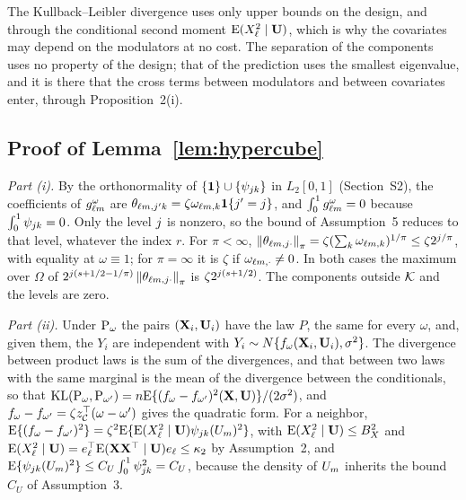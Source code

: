 The Kullback--Leibler divergence uses only upper bounds on the design, and
through the conditional second moment $\mathrm{E}(X_{\ell}^{2}\mid\mathbf{U})$, which is why
the covariates may depend on the modulators at no cost. The separation of the
components uses no property of the design; that of the prediction uses the
smallest eigenvalue, and it is there that the cross terms between modulators
and between covariates enter, through Proposition~2(i).

\subsection*{Proof of Lemma~\ref{lem:hypercube}}

\emph{Part (i).} By the orthonormality of $\{\mathbf{1}\}\cup\{\psi_{jk}\}$
in $L_2[0,1]$ (Section~S2), the coefficients of $g_{\ell m}^{\omega}$
are $\theta_{\ell m,j'k} = \zeta\omega_{\ell m,k}\mathbf{1}\{j' =
j\}$, and $\int_0^1g_{\ell m}^{\omega} = 0$ because
$\int_0^1\psi_{jk} = 0$. Only the level $j$ is nonzero, so the bound
of Assumption~5 reduces to that level, whatever the index $r$. For
$\pi < \infty$, $\left\lVert \theta_{\ell m,j\cdot} \right\rVert_{\pi} =
\zeta(\sum_{k}\omega_{\ell m,k})^{1/\pi} \le \zeta2^{j/\pi}$, with
equality at $\omega \equiv 1$; for $\pi = \infty$ it is $\zeta$ if
$\omega_{\ell m,\cdot} \ne 0$. In both cases the maximum over $\Omega$ of
$2^{j(s+1/2-1/\pi)}\left\lVert \theta_{\ell m,j\cdot} \right\rVert_{\pi}$ is
$\zeta2^{j(s+1/2)}$. The components outside $\mathcal{K}$ and the levels are
zero.

\emph{Part (ii).} Under $\mathrm{P}_{\omega}$ the pairs $(\mathbf{X}_i,\mathbf{U}_i)$ have the
law $P$, the same for every $\omega$, and, given them, the $Y_i$ are
independent with $Y_i \sim N\{f_{\omega}(\mathbf{X}_i,\mathbf{U}_i),\sigma^{2}\}$. The
divergence between product laws is the sum of the divergences, and that
between two laws with the same marginal is the mean of the divergence between
the conditionals, so that
$\operatorname{KL}(\mathrm{P}_{\omega},\mathrm{P}_{\omega'}) =
n\mathrm{E}\{(f_{\omega}-f_{\omega'})^{2}(\mathbf{X},\mathbf{U})\}/(2\sigma^{2})$, and
$f_{\omega}-f_{\omega'} = \zeta z_{\mathcal{C}}^{\top}(\omega-\omega')$ gives the
quadratic form. For a neighbor, $\mathrm{E}\{(f_{\omega}-f_{\omega'})^{2}\} =
\zeta^{2}\mathrm{E}\{\mathrm{E}(X_{\ell}^{2}\mid\mathbf{U})\psi_{jk}(U_{m})^{2}\}$, with
$\mathrm{E}(X_{\ell}^{2}\mid\mathbf{U}) \le B_X^{2}$ and $\mathrm{E}(X_{\ell}^{2}\mid\mathbf{U}) =
e_{\ell}^{\top}\mathrm{E}(\mathbf{X}\mathbf{X}^{\top}\mid\mathbf{U})e_{\ell} \le \kappa_2$ by Assumption~2, and
$\mathrm{E}\{\psi_{jk}(U_{m})^{2}\} \le C_U\int_0^1\psi_{jk}^{2} = C_U$,
because the density of $U_{m}$ inherits the bound $C_U$ of Assumption~3.

